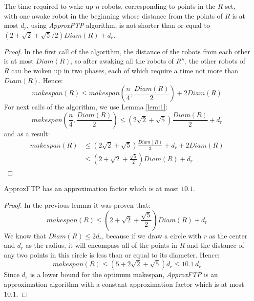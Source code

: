 \documentclass{cccg12}
\begin{document}
\begin{lemma}
\label{lem:2}
The time required to wake up $n$ robots, corresponding to points in the $R$ set, with one awake robot in the beginning whose distance from the points of $R$ is at most $d_r$, using \textit{ApproxFTP} algorithm, is not shorter than or equal to
${ (2+\sqrt{2}+\sqrt{5}/2)Diam(R)+d_r }$.
\end{lemma}
\begin{proof}
In the first call of the algorithm, the distance of the robots from each other is at most ${ Diam(R) }$, so after awaking all the robots of $R''$, the other robots of $R$ can be woken up in two phases, each of which require a time not more than ${ Diam(R) }$. Hence:
{\small$$ makespan(R) \leq makespan(\frac{n}{4},\frac{Diam(R)}{2})+2Diam(R) $$}
For next calls of the algorithm, we use Lemma \ref{lem:1}:
{\small$$ makespan(\frac{n}{4},\frac{Diam(R)}{2}) \leq (2\sqrt{2}+\!\sqrt{5})\frac{Diam(R)}{2}+d_r $$}
and as a result:
{\small\begin{align}
makespan(R) &\leq (2\sqrt{2}+\!\sqrt{5})\frac{Diam(R)}{2}+d_r+2 Diam(R) \nonumber\\
			&\leq (2+\sqrt{2}+\frac{\sqrt{5}}{2})Diam(R)+d_r \nonumber
\end{align}}
\end{proof}

\begin{theorem}
ApproxFTP has an approximation factor which is at most $10.1$.
\end{theorem}
\begin{proof}
In the previous lemma it was proven that:
{\small$$ makespan(R) \leq (2+\sqrt{2}+\frac{\sqrt{5}}{2})Diam(R)+d_r $$}
We know that ${ Diam(R) \leq 2d_r }$, because if we draw a circle with $r$ as the center and $d_r$ as the radius, it will encompass all of the points in $R$ and the distance of any two points in this circle is less than or equal to its diameter. Hence:
{\small$$ makespan(R) \leq (5+2\sqrt{2}+\sqrt{5})d_r \leq 10.1~d_r $$}
Since $d_r$ is a lower bound for the optimum makespan, \textit{ApproxFTP} is an approximation algorithm with a constant approximation factor which is at most $10.1$.
\end{proof}
\end{document}

